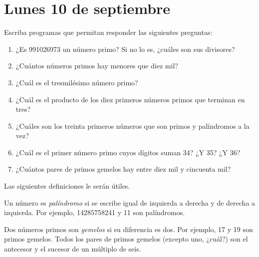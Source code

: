\documentclass[12pt,spanish]{article}
\begin{document}
  \thispagestyle{empty}
  \section*{Lunes 10 de septiembre}

  Escriba programas que permitan responder las siguientes preguntas:

  \begin{enumerate}
    \item ¿Es 991026973 un número primo?
      Si no lo es, ¿cuáles son sus divisores?
    \item ¿Cuántos números primos hay menores que diez mil?
    \item ¿Cuál es el tresmilésimo número primo?
    \item ¿Cuál es el producto de los diez primeros números primos
      que terminan en tres?
    \item ¿Cuáles son los treinta primeros números
      que son primos y palíndromos a la vez?
    \item ¿Cuál es el primer número primo cuyos dígitos suman 34?
      ¿Y 35?  ¿Y 36?
    \item ¿Cuántos pares de primos gemelos hay entre
      diez mil y cincuenta mil?
  \end{enumerate}

  Las siguientes definiciones le serán útiles.

  Un número es \emph{palíndromo} si se escribe igual de izquierda a derecha
  y de derecha a izquierda. Por ejemplo, 14285758241 y 11 son palíndromos.

  Dos números primos son \emph{gemelos} si su diferencia es dos.
  Por ejemplo, 17 y 19 son primos gemelos.
  Todos los pares de primos gemelos (excepto uno, ¿cuál?)
  son el antecesor y el sucesor de un múltiplo de seis.
\end{document}
